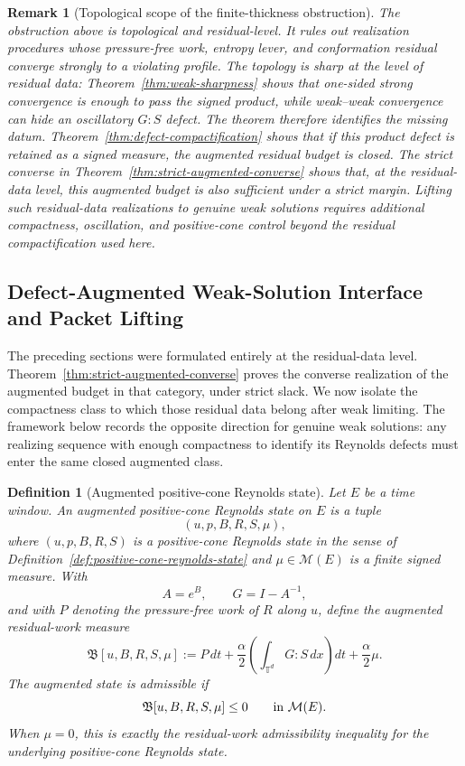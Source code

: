 \documentclass[11pt]{article}
\numberwithin{equation}{section}
\newtheorem{definition}[theorem]{Definition}
\newtheorem{remark}[theorem]{Remark}
\newcommand{\T}{\mathbb T}
\newcommand{\Id}{I}
\begin{document}
\begin{remark}[Topological scope of the finite-thickness obstruction]
The obstruction above is topological and residual-level.  It rules out
realization procedures whose pressure-free work, entropy lever, and conformation
residual converge strongly to a violating profile.  The topology is sharp at
the level of residual data: Theorem~\ref{thm:weak-sharpness} shows that
one-sided strong convergence is enough to pass the signed product, while
weak--weak convergence can hide an oscillatory \(G:S\) defect.  The theorem
therefore identifies the missing datum.  Theorem~\ref{thm:defect-compactification}
shows that if this product defect is retained as a signed measure, the
augmented residual budget is closed.  The strict converse in
Theorem~\ref{thm:strict-augmented-converse} shows that, at the residual-data
level, this augmented budget is also sufficient under a strict margin.  Lifting
such residual-data realizations to genuine weak solutions requires additional
compactness, oscillation, and positive-cone control beyond the residual
compactification used here.
\end{remark}

\subsection{Defect-Augmented Weak-Solution Interface and Packet Lifting}
\label{sec:weak-compactness}

The preceding sections were formulated entirely at the residual-data level.
Theorem~\ref{thm:strict-augmented-converse} proves the converse realization of
the augmented budget in that category, under strict slack.  We now isolate the
compactness class to which those residual data belong after weak limiting.  The
framework below records the opposite direction for genuine weak solutions: any
realizing sequence with enough compactness to identify its Reynolds defects
must enter the same closed augmented class.

\begin{definition}[Augmented positive-cone Reynolds state]
\label{def:augmented-reynolds-state}
Let \(E\) be a time window.  An augmented positive-cone Reynolds state on \(E\)
is a tuple
\[
  (u,p,B,R,S,\mu),
\]
where \((u,p,B,R,S)\) is a positive-cone Reynolds state in the sense of
Definition~\ref{def:positive-cone-reynolds-state} and
\(\mu\in\mathcal M(E)\) is a finite signed measure.  With
\[
  A=e^B,\qquad G=\Id-A^{-1},
\]
and with \(P\) denoting the pressure-free work of \(R\) along \(u\), define the
augmented residual-work measure
\begin{equation}
  \mathfrak B[u,B,R,S,\mu]
  :=
  P\,dt+\frac{\alpha}{2}
  \left(\int_{\T^d}G:S\,dx\right)dt
  +\frac{\alpha}{2}\mu .
  \label{eq:augmented-budget-measure}
\end{equation}
The augmented state is admissible if
\[
  \mathfrak B[u,B,R,S,\mu]\le0
  \qquad\hbox{in }\mathcal M(E).
\]
When \(\mu=0\), this is exactly the residual-work admissibility inequality for
the underlying positive-cone Reynolds state.
\end{definition}
\end{document}

